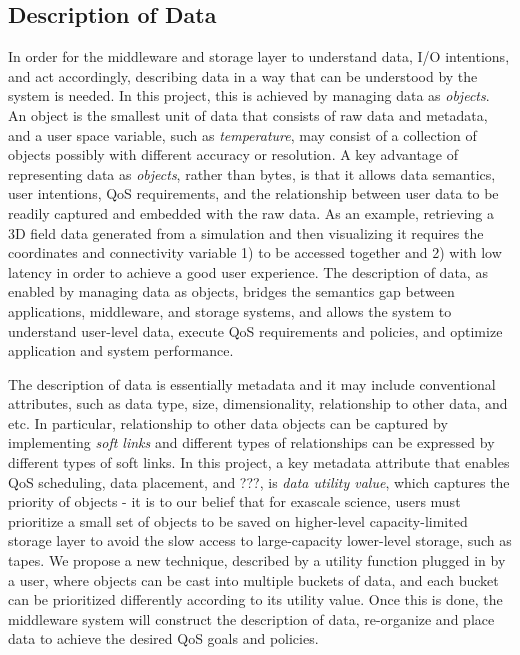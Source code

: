 \subsection{Description of Data}
In order for the middleware and storage layer to understand data,
I/O intentions, and act accordingly, describing data in a way that can
be understood by the system is needed. In this project, this is achieved 
by managing data as \textit{objects}.
An object is the smallest unit of data that consists of raw data and metadata,
and a user space variable, such as \textit{temperature}, may consist of a collection
of objects possibly with different accuracy or resolution.
A key advantage of representing data as \textit{objects}, rather than 
bytes, is that it allows data semantics, user intentions, QoS requirements, and
the relationship between user data to be readily captured and embedded with the 
raw data. As an example, retrieving a 3D field data generated from a simulation and then visualizing it
requires the coordinates and connectivity variable 1) to be accessed together and 2) with low
latency in order to achieve a good user experience. The description of data, 
as enabled by managing data as objects, bridges 
the semantics gap between applications, middleware, and storage systems,
and allows the system to understand user-level data, execute QoS requirements and policies, and
optimize application and system performance.

The description of data is essentially metadata and it may include conventional attributes, such as 
data type, size, dimensionality, relationship to other data, and etc. In particular,
relationship to other data objects can be captured by implementing \textit{soft links}
and different types of relationships can be expressed by different types of soft links. 
In this project, a key metadata attribute
that enables QoS scheduling, data placement, and ???, is \textit{data utility value}, which
captures the priority of objects - it is to our belief that
for exascale science, users must prioritize a small set of objects to be saved on 
higher-level capacity-limited storage layer
to avoid the slow access to large-capacity lower-level storage, such as tapes.
We propose a new technique, described by a utility function plugged in by a user, where objects
can be cast into multiple buckets of data, and each bucket can be prioritized differently according
to its utility value.
Once this is done, the middleware system will construct the description of data, re-organize
and place data to achieve the desired QoS goals and policies.

